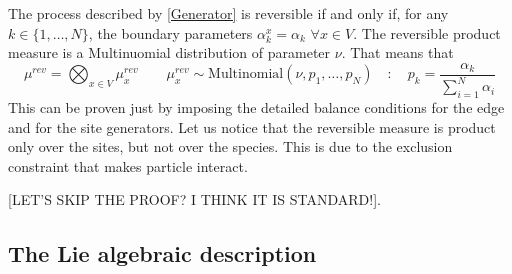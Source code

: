 \documentclass[11pt]{article}
\numberwithin{equation}{section}
\newcommand{\twoj}{\nu}
\begin{document}
The process described by \eqref{Generator} is reversible if and only if, for any $k\in\{1,\ldots,N\}$, the boundary parameters $\alpha_{k}^{x}=\alpha_{k}$ $\forall x\in V$. The reversible product measure is a Multinuomial distribution of parameter $\twoj$. That means that 
\begin{equation}\label{reversibleMeasure}
    \mu^{rev}=\bigotimes_{x\in V}\mu^{rev}_{x}\qquad \mu_{x}^{rev}\sim \text{Multinomial}\left(\twoj,p_{1},\ldots,p_{N}\right)\quad :\quad p_{k}=\frac{\alpha_{k}}{\sum_{i=1}^{N}\alpha_{i}}
\end{equation}
This can be proven just by imposing the detailed balance conditions for the edge and for the site generators. Let us notice that the reversible measure is product only over the sites, but not over the species. This is due to the exclusion constraint that makes particle interact. 

{\color{red}[LET'S SKIP THE PROOF? I THINK IT IS STANDARD!]}.\\
\subsection{The Lie algebraic description}



\end{document}
